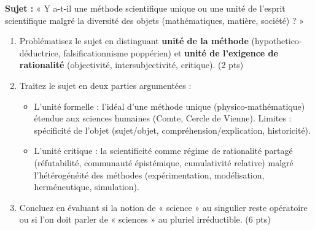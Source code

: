 \documentclass[11pt]{article}
\begin{document}
\begin{exercice}
\textbf{Sujet :} « Y a-t-il une méthode scientifique unique ou une unité de l'esprit scientifique malgré la diversité des objets (mathématiques, matière, société) ? »
\begin{enumerate}
    \item Problématisez le sujet en distinguant \textbf{unité de la méthode} (hypothetico-déductrice, falsificationnisme poppérien) et \textbf{unité de l'exigence de rationalité} (objectivité, intersubjectivité, critique). \hfill (2 pts)
    \item Traitez le sujet en deux parties argumentées :
    \begin{itemize}
        \item[1.] L'unité formelle : l'idéal d'une méthode unique (physico-mathématique) étendue aux sciences humaines (Comte, Cercle de Vienne). Limites : spécificité de l'objet (sujet/objet, compréhension/explication, historicité).
        \item[2.] L'unité critique : la scientificité comme régime de rationalité partagé (réfutabilité, communauté épistémique, cumulativité relative) malgré l'hétérogénéité des méthodes (expérimentation, modélisation, herméneutique, simulation).
    \end{itemize}
    \item Concluez en évaluant si la notion de « science » au singulier reste opératoire ou si l'on doit parler de « sciences » au pluriel irréductible. \hfill (6 pts)
\end{enumerate}
\end{exercice}
\end{document}
